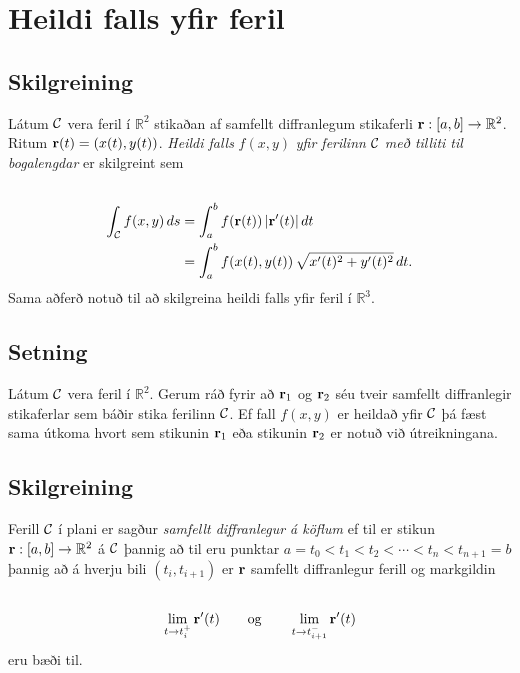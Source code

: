 \documentclass[a4paper,10pt,icelandic]{sphinxmanual}
\begin{document}
\section{Heildi falls yfir feril}
\label{Kafli5:heildi-falls-yfir-feril}

\subsection{Skilgreining}
\label{Kafli5:id5}
Látum \(\cal C\) vera feril í \({\mathbb  R}^2\) stikaðan af
samfellt diffranlegum stikaferli
\(\mbox{${\bf r}$}:[a,b]\rightarrow{\mathbb  R}^2\). Ritum
\(\mbox{${\bf r}$}(t)=(x(t),y(t))\). \emph{Heildi falls} \(f(x,y)\)
\emph{yfir ferilinn} \(\cal C\) \emph{með tilliti til bogalengdar} er
skilgreint sem
\begin{gather}
\begin{split}\displaystyle\end{split}\notag\\\begin{split}\begin{aligned}
\int_{\cal C}f(x,y)\,ds&=\int_a^b f(\mbox{${\bf r}$}(t))\,|\mbox{${\bf r}$}'(t)|\,dt\\
&=\int_a^b f(x(t),y(t))\,\sqrt{x'(t)^2+y'(t)^2}\,dt.\end{aligned}\end{split}\notag
\end{gather}
Sama aðferð notuð til að skilgreina heildi falls yfir feril í
\({\mathbb  R}^3\).


\subsection{Setning}
\label{Kafli5:id6}
Látum \(\cal C\) vera feril í \({\mathbb  R}^2\). Gerum ráð
fyrir að \(\mbox{${\bf r}$}_1\) og \(\mbox{${\bf r}$}_2\) séu
tveir samfellt diffranlegir stikaferlar sem báðir stika ferilinn
\(\cal C\). Ef fall \(f(x,y)\) er heildað yfir \(\cal C\) þá
fæst sama útkoma hvort sem stikunin \(\mbox{${\bf r}$}_1\) eða
stikunin \(\mbox{${\bf r}$}_2\) er notuð við útreikningana.


\subsection{Skilgreining}
\label{Kafli5:id7}
Ferill \(\cal C\) í plani er sagður \emph{samfellt diffranlegur á köflum}
ef til er stikun
\(\mbox{${\bf r}$}:[a,b]\rightarrow {\mathbb  R}^2\) á
\(\cal C\) þannig að til eru punktar
\(a=t_0<t_1<t_2<\cdots<t_n<t_{n+1}=b\) þannig að á hverju bili
\((t_i,t_{i+1})\) er \(\mbox{${\bf r}$}\) samfellt diffranlegur
ferill og markgildin
\begin{gather}
\begin{split}\displaystyle\end{split}\notag\\\begin{split}\lim_{t\rightarrow t_i^+}\mbox{${\bf r}$}'(t)\qquad\mbox{og}\qquad
\lim_{t\rightarrow t_{i+1}^-}\mbox{${\bf r}$}'(t)\end{split}\notag
\end{gather}
eru bæði til.
\end{document}
